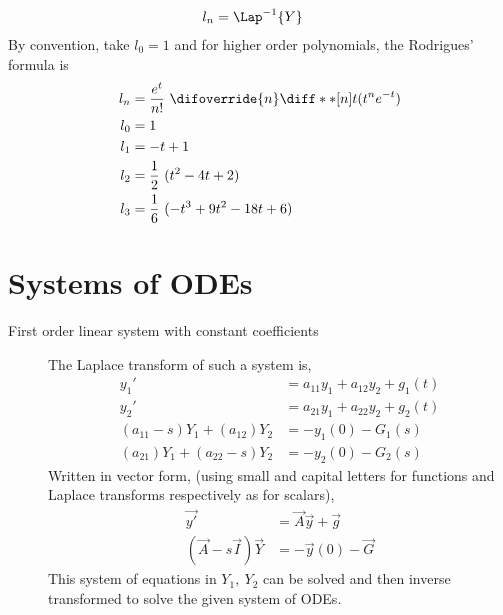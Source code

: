 \begin{description}
\begin{align}
            l_n                               & = \Lap^{-1}\{Y\}
        \end{align}
        By convention, take $ l_0 = 1 $ and for higher order polynomials, the Rodrigues'
        formula is
        \begin{align}
            l_n & = \frac{e^t}{n!}\ \difoverride{n} \diff**[n]{t}{(t^n e^{-t})} \\
            l_0 & = 1                                                           \\
            l_1 & = -t + 1                                                      \\
            l_2 & =\frac{1}{2}\ (t^2 - 4t + 2)                                  \\
            l_3 & = \frac{1}{6}\ (-t^3 + 9t^2 - 18t + 6)
        \end{align}
\end{description}

\section{Systems of ODEs}

\begin{description}
    \item[First order linear system with constant coefficients] The Laplace transform of
        such a system is,
        \begin{align}
            y_1'                          & = a_{11}y_1 + a_{12}y_2 + g_1(t) \\
            y_2'                          & = a_{21}y_1 + a_{22}y_2 + g_2(t) \\
            (a_{11} - s)Y_1 + (a_{12})Y_2 & = -y_1(0) - G_1(s)               \\
            (a_{21})Y_1 + (a_{22} - s)Y_2 & = -y_2(0) - G_2(s)
        \end{align}
        Written in vector form, (using small and capital letters for functions and
        Laplace transforms respectively as for scalars),
        \begin{align}
            \vec{y'}                    & = \vec{A}\vec{y} + \vec{g} \\
            (\vec{A} - s\vec{I})\vec{Y} & = -\vec{y}(0) - \vec{G}
        \end{align}
        This system of equations in $ Y_1,\ Y_2$ can be solved and then inverse
        transformed to solve the given system of ODEs.

\end{description}